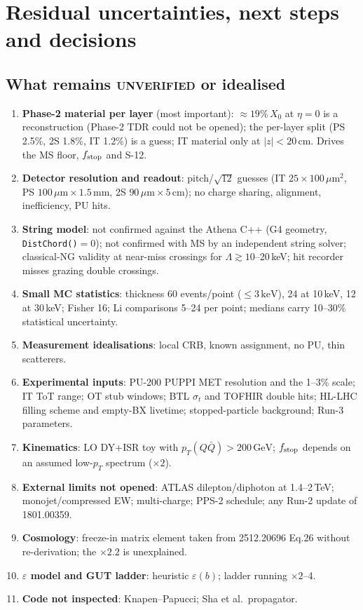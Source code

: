 \documentclass[11pt,a4paper]{article}
\newcommand{\UNV}{\textsc{unverified}}
\newcommand{\GeV}{\ensuremath{\,\mathrm{GeV}}}
\newcommand{\keV}{\ensuremath{\,\mathrm{keV}}}
\newcommand{\pTQQ}{p_T(Q\bar Q)}
\newcommand{\um}{\ensuremath{\,\mu\mathrm{m}}}
\begin{document}
\section{Residual uncertainties, next steps and decisions}\label{sec:next}
\subsection{What remains \UNV{} or idealised}
\begin{enumerate}
\item \textbf{Phase-2 material per layer} (most important): $\approx19\%\,X_0$ at $\eta=0$ is a reconstruction (Phase-2 TDR could not be opened); the per-layer split (PS 2.5\%, 2S 1.8\%, IT 1.2\%) is a guess; IT material only at $|z|<20$\,cm. Drives the MS floor, $f_{\rm stop}$ and S-12.
\item \textbf{Detector resolution and readout}: pitch/$\sqrt{12}$ guesses (IT $25\times100\,\mu$m$^2$, PS $100\um\times1.5$\,mm, 2S $90\um\times5$\,cm); no charge sharing, alignment, inefficiency, PU hits.
\item \textbf{String model}: not confirmed against the Athena C++ (G4 geometry, \texttt{DistChord()}$=0$); not confirmed with MS by an independent string solver; classical-NG validity at near-miss crossings for $\Lambda\gtrsim10$--20\,keV; hit recorder misses grazing double crossings.
\item \textbf{Small MC statistics}: thickness 60 events/point ($\le3\keV$), 24 at 10\,keV, 12 at 30\,keV; Fisher 16; Li comparisons 5--24 per point; medians carry 10--30\% statistical uncertainty.
\item \textbf{Measurement idealisations}: local CRB, known assignment, no PU, thin scatterers.
\item \textbf{Experimental inputs}: PU-200 PUPPI MET resolution and the 1--3\% scale; IT ToT range; OT stub windows; BTL $\sigma_t$ and TOFHIR double hits; HL-LHC filling scheme and empty-BX livetime; stopped-particle background; Run-3 parameters.
\item \textbf{Kinematics}: LO DY+ISR toy with $\pTQQ>200\GeV$; $f_{\rm stop}$ depends on an assumed low-$p_T$ spectrum ($\times2$).
\item \textbf{External limits not opened}: ATLAS dilepton/diphoton at 1.4--2\,TeV; monojet/compressed EW; multi-charge; PPS-2 schedule; any Run-2 update of 1801.00359.
\item \textbf{Cosmology}: freeze-in matrix element taken from 2512.20696 Eq.26 without re-derivation; the $\times2.2$ is unexplained.
\item \textbf{$\varepsilon$ model and GUT ladder}: heuristic $\varepsilon(b)$; ladder running $\times2$--4.
\item \textbf{Code not inspected}: Knapen--Papucci; Sha et al.\ propagator.
\end{enumerate}
\end{document}
